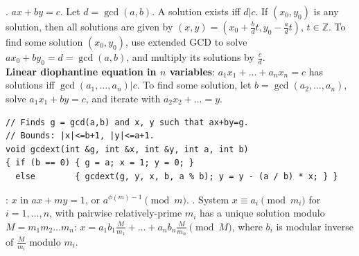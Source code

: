 . $ax+by=c$.
Let $d=\gcd(a,b)$. A solution exists iff $d|c$.
If $(x_0,y_0)$ is any solution, then all solutions are given by
$(x,y) = (x_0 + \frac{b}{d}t, y_0 - \frac{a}{d}t)$, $t \in {\mathbb Z}$.
To find some solution $(x_0, y_0)$, use extended GCD to solve
$ax_0 + by_0 = d = \gcd(a, b)$, and multiply its solutions by $\frac{c}{d}$.\\
\textbf{Linear diophantine equation in $n$ variables}:
$a_1 x_1 + \dots + a_n x_n = c$ has solutions iff $\gcd(a_1, \dots, a_n) | c$.
To find some solution, let $b=\gcd(a_2, \dots, a_n)$,
solve $a_1 x_1 + by = c$, and iterate with $a_2 x_2 + \dots = y$. \TopicBreak
{}
\begin{verbatim}
// Finds g = gcd(a,b) and x, y such that ax+by=g.
// Bounds: |x|<=b+1, |y|<=a+1.
void gcdext(int &g, int &x, int &y, int a, int b)
{ if (b == 0) { g = a; x = 1; y = 0; }
  else        { gcdext(g, y, x, b, a % b); y = y - (a / b) * x; } }
\end{verbatim}
:
$x$ in $ax + my = 1$, or $a^{\phi(m)-1} \pmod{m}$. \TopicBreak
{}.
System $x \equiv a_i \pmod{m_i}$ for $i=1,\dots,n$, with
pairwise relatively-prime $m_i$ has a unique solution modulo $M = m_1 m_2 \dots m_n$:
$x = a_1 b_1 \frac{M}{m_1} + \dots + a_n b_n \frac{M}{m_n} \pmod{M}$,
where $b_i$ is modular inverse of $\frac{M}{m_i}$ modulo $m_i$. \\

